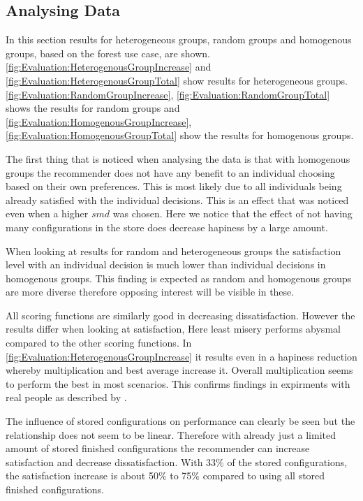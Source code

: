 \subsection{Analysing Data}

In this section results for heterogeneous groups, random groups and homogenous groups, based on the forest use case, are shown. \autoref{fig:Evaluation:HeterogenousGroupIncrease} and \autoref{fig:Evaluation:HeterogenousGroupTotal} show results for heterogeneous groups. \autoref{fig:Evaluation:RandomGroupIncrease}, \autoref{fig:Evaluation:RandomGroupTotal} shows the results for random groups and \autoref{fig:Evaluation:HomogenousGroupIncrease}, \autoref{fig:Evaluation:HomogenousGroupTotal} show the results for homogenous groups.

The first thing that is noticed when analysing the data is that with homogenous groups the recommender does not have any benefit to an individual choosing based on their own preferences. This is most likely due to all individuals being already satisfied with the individual decisions. This is an effect that was noticed even when a higher $smd$ was chosen. Here we notice that the effect of not having many configurations in the store does decrease hapiness by a large amount.

When looking at results for random and heterogeneous groups the satisfaction level with an individual decision is much lower than individual decisions in homogenous groups. This finding is expected as random and homogenous groups are more diverse therefore opposing interest will be visible in these.

All scoring functions are similarly good in decreasing dissatisfaction. However the results differ when looking at satisfaction, Here least misery performs abysmal compared to the other scoring functions. In \autoref{fig:Evaluation:HeterogenousGroupIncrease} it results even in a hapiness reduction whereby multiplication and best average increase it. Overall multiplication seems to perform the best in most scenarios. This confirms findings in expirments with real people as described by \citeauthor{Masthoff2015} \cite[p. 755f]{Masthoff2015}.

The influence of stored configurations on performance can clearly be seen but the relationship does not seem to be linear. Therefore with already just a limited amount of stored finished configurations the recommender can increase satisfaction and decrease dissatisfaction. With 33\% of the stored configurations, the satisfaction increase is about 50\% to 75\% compared to using all stored finished configurations.



